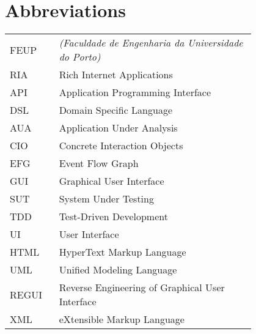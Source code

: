 \chapter*{Abbreviations}

\begin{flushleft}
\begin{tabular}{l p{0.8\linewidth}}
FEUP	& \Feup{} \textit{(Faculdade de Engenharia da Universidade do Porto)}\\
RIA	& Rich Internet Applications \\
API	& Application Programming Interface \\
DSL	& Domain Specific Language \\
AUA	& Application Under Analysis \\
CIO	& Concrete Interaction Objects \\
EFG	& Event Flow Graph \\
GUI	& Graphical User Interface \\
SUT	& System Under Testing \\
TDD	& Test-Driven Development \\
UI	& User Interface \\
HTML	& HyperText Markup Language \\
UML	& Unified Modeling Language \\
REGUI	& Reverse Engineering of Graphical User Interface \\
XML	& eXtensible Markup Language \\
\end{tabular}
\end{flushleft}

